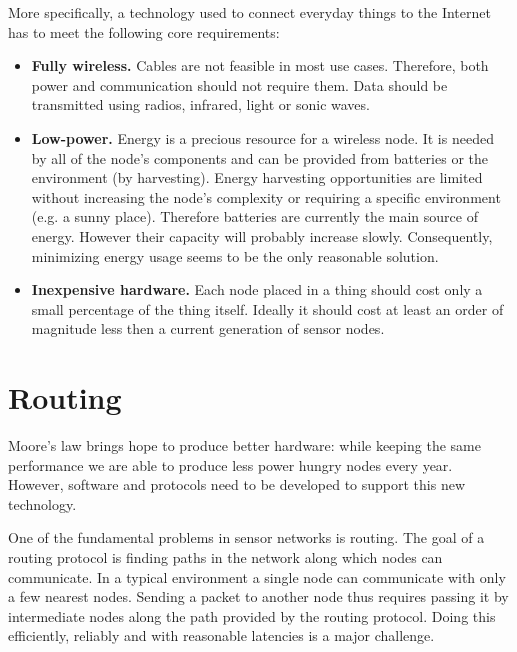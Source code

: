 More specifically, a technology used to connect everyday things to the Internet has to meet the following core requirements:
\begin{itemize}
  \item \textbf{Fully wireless.} Cables are not feasible in most use cases. Therefore, both power and communication should not require them.
Data should be transmitted using radios, infrared, light or sonic waves.
  \item \textbf{Low-power.} Energy is a precious resource for a wireless node.
It is needed by all of the node's components and can be provided from batteries or the environment (by harvesting).
Energy harvesting opportunities are limited without increasing the node's complexity or requiring a specific environment (e.g. a sunny place).
Therefore batteries are currently the main source of energy.
However their capacity will probably increase slowly.
Consequently, minimizing energy usage seems to be the only reasonable solution.
  \item \textbf{Inexpensive hardware.} Each node placed in a thing should cost only a small percentage of the thing itself.
Ideally it should cost at least an order of magnitude less then a current generation of sensor nodes.
\end{itemize}

\section{Routing}
Moore's law brings hope to produce better hardware: while keeping the same performance we are able to produce less power hungry nodes every year.
However, software and protocols need to be developed to support this new technology.

One of the fundamental problems in sensor networks is routing.
The goal of a routing protocol is finding paths in the network along which nodes can communicate.
In a typical environment a single node can communicate with only a few nearest nodes.
Sending a packet to another node thus requires passing it by intermediate nodes along the path provided by the routing protocol.
Doing this efficiently, reliably and with reasonable latencies is a major challenge.

